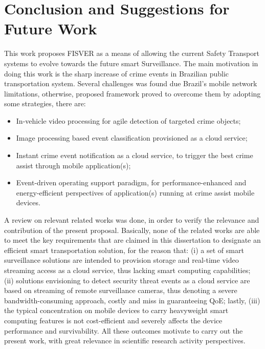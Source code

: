 \chapter{Conclusion and Suggestions for Future Work}


This work proposes FISVER as a means of allowing the current Safety Transport systems to evolve towards the future smart Surveillance. The main motivation in doing this work is the sharp increase of crime events in Brazilian public transportation system. Several challenges was found due Brazil's mobile network limitations, otherwise, proposed framework proved to overcome them by adopting some strategies, there are:

\begin{itemize}
\item In-vehicle video processing for agile detection of targeted crime objects;
\item Image processing based event classification provisioned as a cloud service;
\item Instant crime event notification as a cloud service, to trigger the best crime assist through mobile application(s);
\item Event-driven operating support paradigm, for performance-enhanced and energy-efficient perspectives of application(s) running at crime assist mobile devices.
\end{itemize}

A review on relevant related works was done, in order to verify the relevance and contribution of the present proposal.  Basically, none of the related works are able to meet the key requirements that are claimed in this dissertation to designate an efficient smart transportation solution, for the reason that: (i) a set of smart surveillance solutions are intended to provision storage and real-time video streaming access as a cloud service, thus lacking smart computing capabilities; (ii) solutions envisioning to detect security threat events as a cloud service are based on streaming of remote surveillance cameras, thus denoting a severe bandwidth-consuming approach, costly and miss in guaranteeing QoE; lastly, (iii) the typical concentration on mobile devices to carry heavyweight smart computing features is not cost-efficient and severely affects the device performance and survivability.  All these outcomes motivate to carry out the present work, with great relevance in scientific research activity perspectives.

